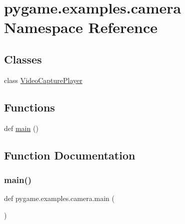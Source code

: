 \hypertarget{namespacepygame_1_1examples_1_1camera}{}\section{pygame.\+examples.\+camera Namespace Reference}
\label{namespacepygame_1_1examples_1_1camera}
\subsection*{Classes}
\begin{DoxyCompactItemize}
\item 
class \hyperlink{classpygame_1_1examples_1_1camera_1_1_video_capture_player}{Video\+Capture\+Player}
\end{DoxyCompactItemize}
\subsection*{Functions}
\begin{DoxyCompactItemize}
\item 
def \hyperlink{namespacepygame_1_1examples_1_1camera_a903a52575bd44b74f87851e0f28fcf7b}{main} ()
\end{DoxyCompactItemize}


\subsection{Function Documentation}
\mbox{\label{namespacepygame_1_1examples_1_1camera_a903a52575bd44b74f87851e0f28fcf7b}} 
\subsubsection{\texorpdfstring{main()}{main()}}
{\footnotesize\ttfamily def pygame.\+examples.\+camera.\+main (\begin{DoxyParamCaption}{ }\end{DoxyParamCaption})}

